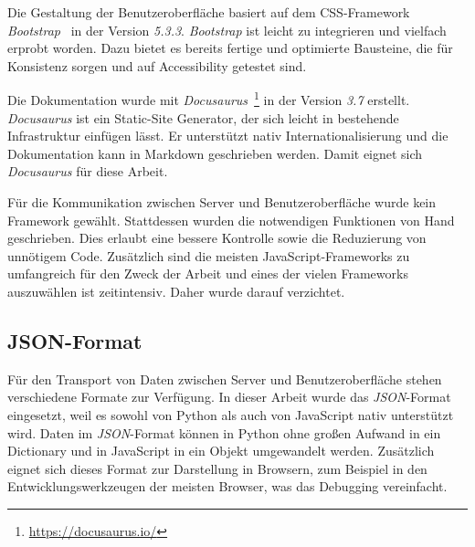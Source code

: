 Die Gestaltung der Benutzeroberfläche basiert auf dem CSS-Framework \textit{Bootstrap}~\cite{bootstrap} in der Version \textit{5.3.3}.
\textit{Bootstrap} ist leicht zu integrieren und vielfach erprobt worden. Dazu bietet es bereits fertige und optimierte Bausteine, die für Konsistenz sorgen und auf Accessibility getestet sind.


Die Dokumentation wurde mit \textit{Docusaurus}~\footnote{\hspace{1.5mm}\url{https://docusaurus.io/}} in der Version \textit{3.7} erstellt. \textit{Docusaurus} ist ein Static-Site Generator, der sich leicht in
bestehende Infrastruktur einfügen lässt. Er unterstützt nativ Internationalisierung und die Dokumentation kann in Markdown geschrieben werden. Damit eignet sich \textit{Docusaurus} für diese Arbeit.

Für die Kommunikation zwischen Server und Benutzeroberfläche wurde kein Framework gewählt. Stattdessen wurden die notwendigen Funktionen von Hand geschrieben. Dies erlaubt eine bessere Kontrolle sowie die
Reduzierung von unnötigem Code. Zusätzlich sind die meisten JavaScript-Frameworks zu umfangreich für den Zweck der Arbeit und eines der vielen Frameworks auszuwählen ist zeitintensiv. Daher wurde darauf verzichtet.

\subsection{JSON-Format}

Für den Transport von Daten zwischen Server und Benutzeroberfläche stehen verschiedene Formate zur Verfügung. In dieser Arbeit wurde das \textit{JSON}-Format eingesetzt,
weil es sowohl von Python als auch von JavaScript nativ unterstützt wird. Daten im \textit{JSON}-Format können in Python ohne großen Aufwand in ein Dictionary und in JavaScript in ein Objekt umgewandelt werden.
Zusätzlich eignet sich dieses Format zur Darstellung in Browsern, zum Beispiel in den Entwicklungswerkzeugen der meisten Browser, was das Debugging vereinfacht.

